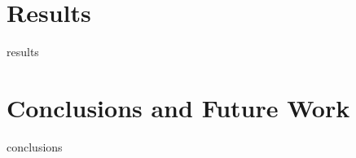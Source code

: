 \documentclass{article}
\begin{document}
\section{Results}
results

\section{Conclusions and Future Work}
conclusions





\end{document}
